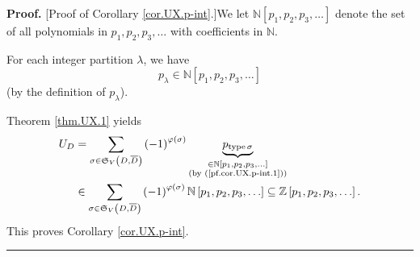 \documentclass[numbers=enddot,12pt,final,onecolumn,notitlepage]{scrartcl}%
\numberwithin{exer}{section}
\theoremstyle{definition}
\newenvironment{proof}[1][Proof]{\noindent\textbf{#1.} }{\ \rule{0.5em}{0.5em}}
\let\sumnonlimits\sum
\renewcommand{\sum}{\sumnonlimits\limits}
\begin{document}
\begin{proof}
[Proof of Corollary \ref{cor.UX.p-int}.]We let $\mathbb{N}\left[  p_{1}%
,p_{2},p_{3},\ldots\right]  $ denote the set of all polynomials in
$p_{1},p_{2},p_{3},\ldots$ with coefficients in $\mathbb{N}$.

For each integer partition $\lambda$, we have%
\begin{equation}
p_{\lambda}\in\mathbb{N}\left[  p_{1},p_{2},p_{3},\ldots\right]
\label{pf.cor.UX.p-int.1}%
\end{equation}
(by the definition of $p_{\lambda}$).

Theorem \ref{thm.UX.1} yields%
\begin{align*}
U_{D}  &  =\sum_{\sigma\in\mathfrak{S}_{V}\left(  D,\overline{D}\right)
}\left(  -1\right)  ^{\varphi\left(  \sigma\right)  }%
\underbrace{p_{\operatorname*{type}\sigma}}_{\substack{\in\mathbb{N}\left[
p_{1},p_{2},p_{3},\ldots\right]  \\\text{(by (\ref{pf.cor.UX.p-int.1}))}}}\\
&  \in\sum_{\sigma\in\mathfrak{S}_{V}\left(  D,\overline{D}\right)  }\left(
-1\right)  ^{\varphi\left(  \sigma\right)  }\mathbb{N}\left[  p_{1}%
,p_{2},p_{3},\ldots\right]  \subseteq\mathbb{Z}\left[  p_{1},p_{2}%
,p_{3},\ldots\right]  .
\end{align*}
This proves Corollary \ref{cor.UX.p-int}.
\end{proof}
\end{document}
